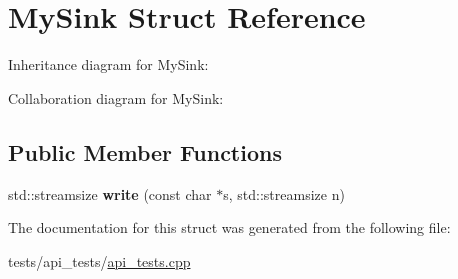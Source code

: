 \hypertarget{struct_my_sink}{}\section{My\+Sink Struct Reference}
\label{struct_my_sink}


Inheritance diagram for My\+Sink\+:


Collaboration diagram for My\+Sink\+:
\subsection*{Public Member Functions}
\begin{DoxyCompactItemize}
\item 
\mbox{\label{struct_my_sink_a4144292cebc49f084f5901fc6ca22ca8}} 
std\+::streamsize {\bfseries write} (const char $\ast$s, std\+::streamsize n)
\end{DoxyCompactItemize}


The documentation for this struct was generated from the following file\+:\begin{DoxyCompactItemize}
\item 
tests/api\+\_\+tests/\mbox{\hyperlink{api__tests_8cpp}{api\+\_\+tests.\+cpp}}\end{DoxyCompactItemize}
